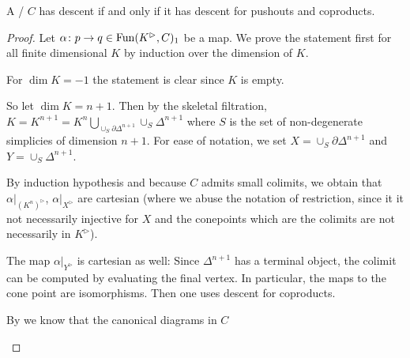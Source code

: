 \begin{lemma}
    A \inftycat/ $C$ has descent if and only if it has descent for pushouts and coproducts. %
    \begin{proof} %
        Let $\alpha\colon p\to q\in\operatorname{Fun}(K^{\rhd},C)_1$ be a map.
        We prove the statement first for all finite dimensional $K$ by induction over the dimension of $K$. %

        For $\dim K=-1$ the statement is clear since $K$ is empty.


        So let $\dim K=n+1$.
        Then by the skeletal filtration, $K=K^{n+1}=K^n\bigcup\limits_{\cup_S \partial\Delta^{n+1}}\cup_S \Delta^{n+1}$ where $S$ is the set of non-degenerate simplicies of dimension $n+1$.
        For ease of notation, we set $X=\cup_S \partial\Delta^{n+1}$ and $Y=\cup_S \Delta^{n+1}$.

        By induction hypothesis and because $C$ admits small colimits, we obtain that $\alpha|_{\left(K^n\right)^{\rhd}}$, $\alpha|_{X^{\rhd}}$ are cartesian (where we abuse the notation of restriction, since it it not necessarily injective for $X$ and the conepoints which are the colimits are not necessarily in $K^{\rhd}$).

        The map $\alpha|_{Y^{\rhd}}$ is cartesian as well: Since $\Delta^{n+1}$ has a terminal object, the colimit can be computed by evaluating the final vertex. 
        In particular, the maps to the cone point are isomorphisms.
        Then one uses descent for coproducts.

        By %
        we know that the canonical diagrams in $C$
        \begin{center}
\end{center}
\end{proof}
\end{lemma}
